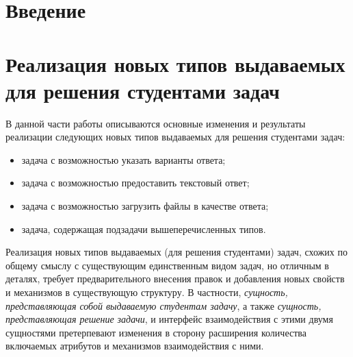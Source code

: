 \documentclass[a4paper]{article}
\begin{document}


\addtocounter{page}{1} %



\newpage
\tableofcontents



\newpage
\section{Введение}



\newpage
\section{Реализация новых типов выдаваемых для решения студентами задач}

В данной части работы описываются основные изменения и результаты реализации следующих новых типов выдаваемых для решения студентами задач:

\begin{itemize}
    \setlength\itemsep{-0.2em}
    \item задача с возможностью указать варианты ответа;
    \item задача с возможностью предоставить текстовый ответ;
    \item задача с возможностью загрузить файлы в качестве ответа;
    \item задача, содержащая подзадачи вышеперечисленных типов.
\end{itemize}

Реализация новых типов выдаваемых (для решения студентами) задач, схожих по общему смыслу с существующим единственным видом задач, но отличным в деталях, требует предварительного внесения правок и добавления новых свойств и механизмов в существующую структуру. В частности, \emph{сущность, представляющая собой выдаваемую студентам задачу}, а также \emph{сущность, представляющая решение задачи}, и интерфейс взаимодействия с этими двумя сущностями претерпевают изменения в сторону расширения количества включаемых атрибутов и механизмов взаимодействия с ними.
\end{document}
